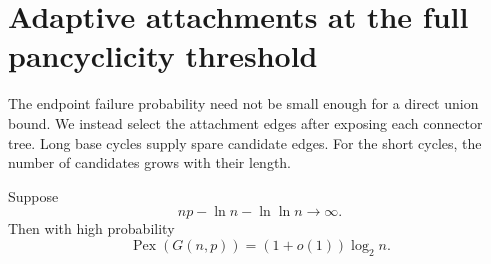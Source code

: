 \section{Adaptive attachments at the full pancyclicity threshold}
\label{sec:rhost-full-threshold}

The endpoint failure probability need not be small enough for a direct union bound.
We instead select the attachment edges after exposing each connector tree.
Long base cycles supply spare candidate edges.
For the short cycles, the number of candidates grows with their length.

\begin{theorem}\label{thm:rhost-full-threshold}
Suppose
\[
 np-\ln n-\ln\ln n\longrightarrow\infty.
\]
Then with high probability
\[
 \operatorname{Pex}(G(n,p))=(1+o(1))\log_2 n.
\]
\end{theorem}

